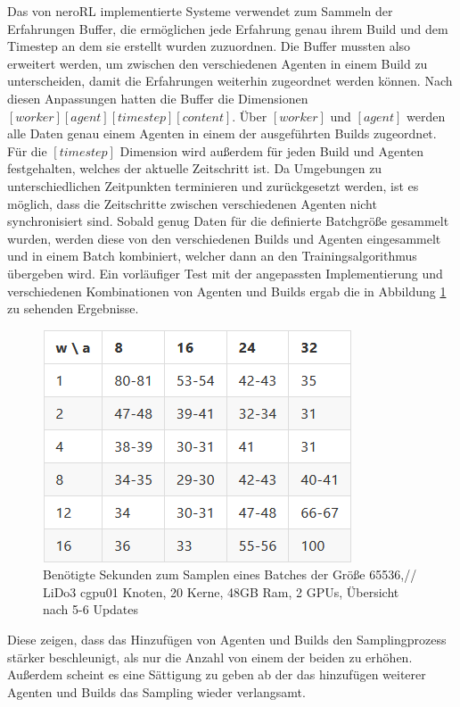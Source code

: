 Das von neroRL implementierte Systeme verwendet zum Sammeln der Erfahrungen Buffer, die ermöglichen jede Erfahrung genau ihrem  Build und dem Timestep an dem sie erstellt wurden zuzuordnen. 
Die Buffer mussten also erweitert werden, um zwischen den verschiedenen Agenten in einem Build zu unterscheiden, damit die Erfahrungen weiterhin zugeordnet werden können. 
Nach diesen Anpassungen hatten die Buffer die Dimensionen $[worker][agent][timestep][content]$. Über $[worker]$ und $[agent]$ werden alle Daten genau einem Agenten in einem der ausgeführten Builds zugeordnet. Für die $[timestep]$ Dimension wird außerdem für jeden Build und Agenten festgehalten, welches der aktuelle Zeitschritt ist. Da Umgebungen zu unterschiedlichen Zeitpunkten terminieren und zurückgesetzt werden, ist es möglich, dass die Zeitschritte zwischen verschiedenen Agenten nicht synchronisiert sind. Sobald genug Daten für die definierte Batchgröße gesammelt wurden, werden diese von den verschiedenen Builds und Agenten eingesammelt und in einem Batch kombiniert, welcher dann an den Trainingsalgorithmus übergeben wird.
Ein vorläufiger Test mit der angepassten Implementierung und verschiedenen Kombinationen von Agenten und Builds ergab die in Abbildung \ref{fig:build-agent-time} zu sehenden Ergebnisse.
\begin{figure}
	\centering
	\includegraphics[width=0.5\linewidth]{resources/img/agent_build_time.png}
	\caption{Benötigte Sekunden zum Samplen eines Batches der Größe 65536,// LiDo3 cgpu01 Knoten, 20 Kerne, 48GB Ram, 2 GPUs, Übersicht nach 5-6 Updates}
	\label{fig:build-agent-time}
\end{figure}
Diese zeigen, dass das Hinzufügen von Agenten und Builds den Samplingprozess stärker beschleunigt, als nur die Anzahl von einem der beiden zu erhöhen. Außerdem scheint es eine Sättigung zu geben ab der das hinzufügen weiterer Agenten und Builds das Sampling wieder verlangsamt.
